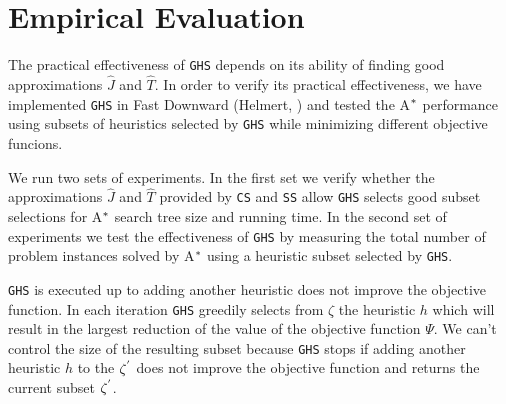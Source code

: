 



\chapter{Empirical Evaluation}\label{ch:empirical_evaluation}
\noindent
The practical effectiveness of \texttt{GHS} depends on its ability of finding good approximations $\hat{J}$ and $\hat{T}$. In order to verify its practical effectiveness, we have implemented \texttt{GHS} in Fast Downward (Helmert, \citeyear{helmert2006fast}) and tested the A$\sp{*}$ performance using subsets of heuristics selected by \texttt{GHS} while minimizing different objective funcions.

We run two sets of experiments. In the first set we verify whether the approximations $\hat{J}$ and $\hat{T}$ provided by \texttt{CS} and \texttt{SS} allow \texttt{GHS} selects good subset selections for A$\sp{*}$ search tree size and running time. In the second set of experiments we test the effectiveness of \texttt{GHS} by measuring the total number of problem instances solved by A$\sp{*}$ using a heuristic subset selected by \texttt{GHS}.

\texttt{GHS} is executed up to adding another heuristic does not improve the objective function. In each iteration \texttt{GHS} greedily selects from $\zeta$ the heuristic $h$ which will result in the largest reduction of the value of the objective function $\Psi$. We can't control the size of the resulting subset because \texttt{GHS} stops if adding another heuristic $h$ to the $\zeta\sp{'}$ does not improve the objective function and returns the current subset $\zeta\sp{'}$.

